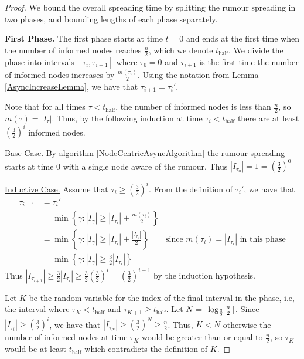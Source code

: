 \begin{proof}
	We bound the overall spreading time by splitting the rumour spreading in two phases, and bounding lengths of each phase separately.

	\textbf{First Phase.} The first phase starts at time $t=0$ and ends at the first time when the number of informed nodes reaches $\frac{n}{2}$, which we denote $t_\text{half}$. We divide the phase into intervals $[\tau_i, \tau_{i+1}]$ where $\tau_0 = 0$ and $\tau_{i+1}$ is the first time the number of informed nodes increases by $\frac{m(\tau_i)}{2}$. 
	Using the notation from Lemma \ref{AsyncIncreaseLemma}, we have that $\tau_{i+1} = \tau_i'$. 
	
	Note that for all times $\tau < t_\text{half}$, the number of informed nodes is less than $\frac{n}{2}$, so $m(\tau) = |I_\tau|$. Thus, by the following induction at time $\tau_i < t_\text{half}$ there are at least $(\frac{3}{2})^i$ informed nodes.

	\underline{Base Case.}
	By algorithm \ref{NodeCentricAsyncAlgorithm} the rumour spreading starts at time 0 with a single node aware of the rumour. Thus $|I_{\tau_0}| = 1 = (\frac{3}{2})^0$

	\underline{Inductive Case.} 
	Assume that $\tau_i \geq (\frac{3}{2})^i$.
	From the definition of $\tau_i'$, we have that 
	\begin{align*}
		\tau_{i+1} &= \tau_i' \\
		&= \min\left\{\gamma : |I_{\gamma}| \geq |I_{\tau_i}| + \frac{m(\tau_i)}{2}\right\} \\
		&= \min\left\{\gamma : |I_{\gamma}| \geq |I_{\tau_i}| + \frac{|I_{\tau_i}|}{2}\right\} & \text{since } m(\tau_i) = |I_{\tau _i}| \text{ in this phase} \\ 
		&= \min\left\{\gamma : |I_{\gamma}| \geq \frac{3}{2}|I_{\tau_i}|\right\} 
	\end{align*}
	Thus $|I_{\tau_{i+1}}| \geq \frac{3}{2}|I_{\tau_i}| \geq \frac{3}{2}(\frac{3}{2})^i = (\frac{3}{2})^{i+1}$ by the induction hypothesis. 
	
	Let $K$ be the random variable for the index of the final interval in the phase, i.e, the interval where $\tau_K < t_\text{half}$ and $\tau_{K+1} \geq t_\text{half}$.
	Let $N = \lceil\log_\frac{3}{2}\frac{n}{2}\rceil$.  Since $|I_{\tau_i}| \geq (\frac{3}{2})^i$, we have that $|I_{\tau_N}| \geq (\frac{3}{2})^N \geq \frac{n}{2}$. Thus, $K < N$ otherwise the number of informed nodes at time $\tau_K$ would be greater than or equal to $\frac{n}{2}$, so $\tau_K$ would be at least $t_\text{half}$ which contradicts the definition of $K$.


\end{proof}
